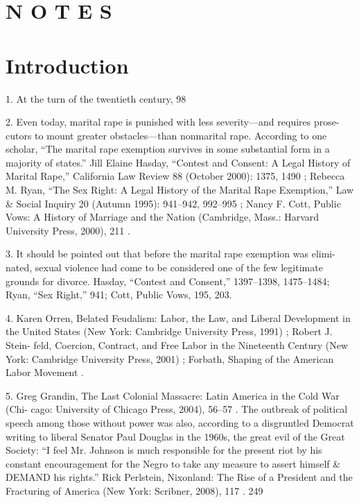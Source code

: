 


\section{N O T E S}


\section{Introduction}


	{\color{blue}1}. At the turn of the twentieth century, 98%


	{\color{blue}2}. Even today, marital rape is punished with less severity—and requires prose- cutors to mount greater obstacles—than nonmarital rape. According to one scholar, “The marital rape exemption survives in some substantial form in a majority of states.” Jill Elaine Hasday, “Contest and Consent: A Legal History of Marital Rape,” California Law Review 88 (October 2000): 1375, 1490 ; Rebecca M. Ryan, “The Sex Right: A Legal History of the Marital Rape Exemption,” Law & Social Inquiry 20 (Autumn 1995): 941–942, 992–995 ; Nancy F. Cott, Public Vows: A History of Marriage and the Nation (Cambridge, Mass.: Harvard University Press, 2000), 211 .


	{\color{blue}3}. It should be pointed out that before the marital rape exemption was elimi- nated, sexual violence had come to be considered one of the few legitimate grounds for divorce. Hasday, “Contest and Consent,” 1397–1398, 1475–1484; Ryan, “Sex Right,” 941; Cott, Public Vows, 195, 203.


	{\color{blue}4}. Karen Orren, Belated Feudalism: Labor, the Law, and Liberal Development in the United States (New York: Cambridge University Press, 1991) ; Robert J. Stein- feld, Coercion, Contract, and Free Labor in the Nineteenth Century (New York: Cambridge University Press, 2001) ; Forbath, Shaping of the American Labor Movement .


	{\color{blue}5}. Greg Grandin, The Last Colonial Massacre: Latin America in the Cold War (Chi- cago: University of Chicago Press, 2004), 56–57 . The outbreak of political speech among those without power was also, according to a disgruntled Democrat writing to liberal Senator Paul Douglas in the 1960s, the great evil of the Great Society: “I feel Mr. Johnson is much responsible for the present riot by his constant encouragement for the Negro to take any measure to assert himself & DEMAND his rights.” Rick Perlstein, Nixonland: The Rise of a President and the Fracturing of America (New York: Scribner, 2008), 117 . 249



